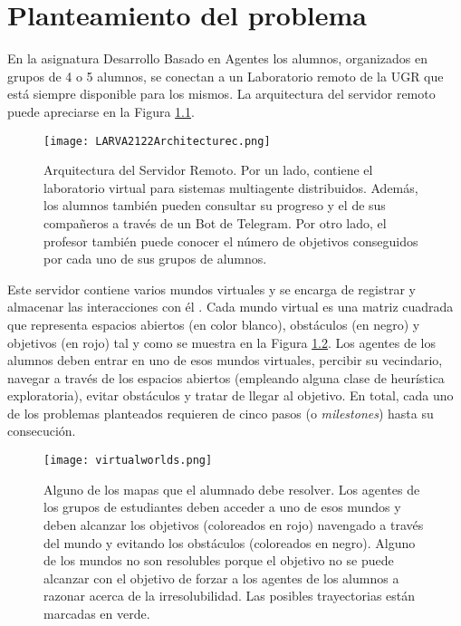 \chapter{Planteamiento del problema}

En la asignatura Desarrollo Basado en Agentes los alumnos, organizados en grupos de 4 o 5 alumnos, se conectan a un Laboratorio remoto de la UGR que está siempre disponible para los mismos. La arquitectura del servidor remoto puede apreciarse en la Figura \ref{fig:architecture}.

\begin{figure}[H]
    \centering
    \texttt{[image: LARVA2122Architecturec.png]}
    \caption{Arquitectura del Servidor Remoto. Por un lado, contiene el laboratorio virtual para sistemas multiagente distribuidos. Además, los alumnos también pueden consultar su progreso y el de sus compañeros a través de un Bot de Telegram. Por otro lado, el profesor también puede conocer el número de objetivos conseguidos por cada uno de sus grupos de alumnos.}
    \label{fig:architecture}
\end{figure}

Este servidor contiene varios mundos virtuales y se encarga de registrar y almacenar las interacciones con él \cite{Vidal_2016}. Cada mundo virtual es una matriz cuadrada que representa espacios abiertos (en color blanco), obstáculos (en negro) y objetivos (en rojo) tal y como se muestra en la Figura \ref{fig:map}. Los agentes de los alumnos deben entrar en uno de esos mundos virtuales, percibir su vecindario, navegar a través de los espacios abiertos (empleando alguna clase de heurística exploratoria), evitar obstáculos y tratar de llegar al objetivo. En total, cada uno de los problemas planteados requieren de cinco pasos (o \emph{milestones}) hasta su consecución.

\begin{figure}[H]
    \centering
    \texttt{[image: virtualworlds.png]}
    \caption{Alguno de los mapas que el alumnado debe resolver. Los agentes de los grupos de estudiantes deben acceder a uno de esos mundos y deben alcanzar los objetivos (coloreados en rojo) navengado a través del mundo y evitando los obstáculos (coloreados en negro). Alguno de los mundos no son resolubles porque el objetivo no se puede alcanzar con el objetivo de forzar a los agentes de los alumnos a razonar acerca de la irresolubilidad. Las posibles trayectorias están marcadas en verde.}
    \label{fig:map}
\end{figure}

